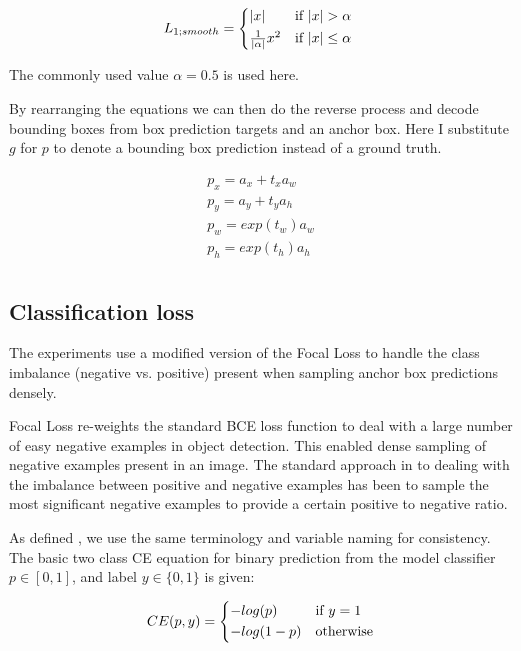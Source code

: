 \begin{equation}
L_{1;smooth} = 
\begin{cases*}
|x| & if $|x|>\alpha $ \\
\frac{1}{|\alpha|}x^2 & if $|x| \leq \alpha$
\end{cases*}
\label{eq:smooth_l1}
\end{equation}

The commonly used value $\alpha = 0.5$ is used here.

By rearranging the equations we can then do the reverse process and decode bounding boxes from box prediction targets and an anchor box. Here I substitute $ g $ for $ p $ to denote a bounding box prediction instead of a ground truth.

\begin{equation}
\begin{split}
p_x = a_x + t_x  a_w\\
p_y = a_y + t_y  a_h\\
p_w = exp(t_w) a_w \\
p_h = exp(t_h) a_h\\
\end{split}
\label{eq:decoding_rcnn}
\end{equation}

\subsection {Classification loss}
\label{sec:loss}

The experiments use a modified version of the Focal Loss \cite{Lin2017} to handle the class imbalance (negative vs. positive) present when sampling anchor box predictions densely.

Focal Loss \cite{Lin2017} re-weights the standard \gls{BCE} loss function to deal with a large number of easy negative examples in object detection. This enabled dense sampling of negative examples present in an image. The standard approach in to dealing with the imbalance between positive and negative examples has been to sample the most significant negative examples to provide a certain positive to negative ratio.


As defined \cite{Lin2017}, we use the same terminology and variable naming for consistency. The basic two class \gls{CE} equation for binary prediction from the model classifier $p \in \left[0, 1\right]$, and label $y \in \{0, 1\}$  is given:

\begin{equation}
CE(p, y) = 
  \begin{cases*}
  -log(p) & if $y = 1$\\
  -log(1-p) & otherwise\\
  \end{cases*}
\label{eq:cross_entropy}
\end{equation}


